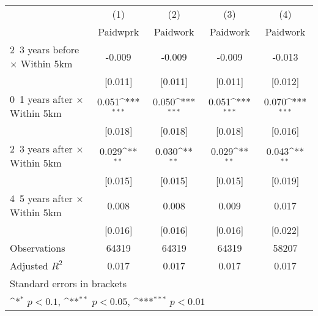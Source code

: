 {
\def\sym#1{\ifmmode^{#1}\else\(^{#1}\)\fi}
\begin{tabular}{l*{4}{c}}
\hline\hline
                    &\multicolumn{1}{c}{(1)}&\multicolumn{1}{c}{(2)}&\multicolumn{1}{c}{(3)}&\multicolumn{1}{c}{(4)}\\
                    &\multicolumn{1}{c}{Paidwprk}&\multicolumn{1}{c}{Paidwork}&\multicolumn{1}{c}{Paidwork}&\multicolumn{1}{c}{Paidwork}\\
\hline
2~3 years before × Within 5km&      -0.009         &      -0.009         &      -0.009         &      -0.013         \\
                    &     [0.011]         &     [0.011]         &     [0.011]         &     [0.012]         \\
0~1 years after × Within 5km&       0.051\sym{***}&       0.050\sym{***}&       0.051\sym{***}&       0.070\sym{***}\\
                    &     [0.018]         &     [0.018]         &     [0.018]         &     [0.016]         \\
2~3 years after × Within 5km&       0.029\sym{**} &       0.030\sym{**} &       0.029\sym{**} &       0.043\sym{**} \\
                    &     [0.015]         &     [0.015]         &     [0.015]         &     [0.019]         \\
4~5 years after × Within 5km&       0.008         &       0.008         &       0.009         &       0.017         \\
                    &     [0.016]         &     [0.016]         &     [0.016]         &     [0.022]         \\
\hline
Observations        &       64319         &       64319         &       64319         &       58207         \\
Adjusted \(R^{2}\)  &       0.017         &       0.017         &       0.017         &       0.017         \\
\hline\hline
\multicolumn{5}{l}{\footnotesize Standard errors in brackets}\\
\multicolumn{5}{l}{\footnotesize \sym{*} \(p<0.1\), \sym{**} \(p<0.05\), \sym{***} \(p<0.01\)}\\
\end{tabular}
}
